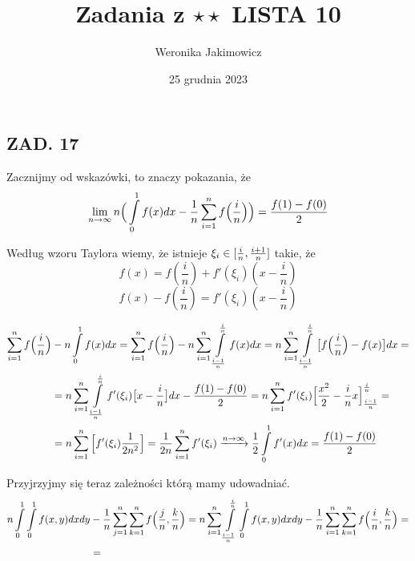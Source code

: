 \documentclass{article}[13pt]
\author{Weronika Jakimowicz}
\title{Zadania z $\star\star$ LISTA 10}
\date{25 grudnia 2023}
\begin{document}
\maketitle

\subsection*{ZAD. 17}

Zacznijmy od wskazówki, to znaczy pokazania, że
$$\lim\limits_{n\to\infty}n\Big(\int\limits_0^1f(x)dx-\frac1n\sum\limits_{i=1}^nf\Big(\frac in\Big)\Big)={f(1)-f(0)\over 2}$$

Według wzoru Taylora wiemy, że istnieje $\xi_i\in[\frac in, {i+1\over n}]$ takie, że
$$f(x)=f(\frac in)+f'(\xi_i)(x-\frac in)$$
$$f(x)-f(\frac in)=f'(\xi_i)(x-\frac in)$$

\begin{align*}
    \sum\limits_{i=1}^nf\Big(\frac in\Big)&-n\int\limits_0^1f(x)dx=\sum\limits_{i=1}^nf\Big(\frac in\Big)-n\sum\limits_{i=1}^n\int\limits_{{i-1\over n}}^\frac inf(x)dx=n\sum\limits_{i=1}^n\int\limits_{{i-1\over n}}^\frac in\big[f\Big(\frac in\Big)-f(x)\big]dx=\\
    &=n\sum\limits_{i=1}^n\int\limits_{{i-1\over n}}^\frac inf'(\xi_i)\big[x-\frac in\big]dx-{f(1)-f(0)\over2}=n\sum\limits_{i=1}^nf'(\xi_i)\Big[{x^2\over 2}-{i\over n}x\Big]_{{i-1\over n}}^\frac in=\\
    &=n\sum\limits_{i=1}^n\Big[f'(\xi_i){1\over2n^2}\Big]=\frac1{2n}\sum\limits_{i=1}^nf'(\xi_i)\xrightarrow{n\to\infty}\frac12\int\limits_0^1f'(x)dx={f(1)-f(0)\over 2}
\end{align*}

Przyjrzyjmy się teraz zależności którą mamy udowadniać.
\begin{align*}
    n\int\limits_0^1\int\limits_0^1f(x,y)dxdy&-\frac1n\sum\limits_{j=1}^n\sum\limits_{k=1}^nf\Big(\frac jn, \frac kn\Big)=n\sum\limits_{i=1}^n\int\limits_{{i-1\over n}}^\frac in\int\limits_0^1f(x,y)dxdy-\frac1n\sum\limits_{i=1}^n\sum\limits_{k=1}^nf\Big(\frac in, \frac kn\Big)=\\
    &=
\end{align*}
\end{document}
